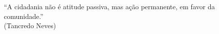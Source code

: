 \begin{epigrafe}
    \vspace*{\fill}
    \begin{flushright}
        \begin{minipage}{9cm} %
            “A cidadania não é atitude passiva, mas ação permanente, em favor da comunidade.”\\
            \vspace{0.3cm}
            \hfill{(Tancredo Neves)}
    \end{minipage}
    \end{flushright}
    
\end{epigrafe}